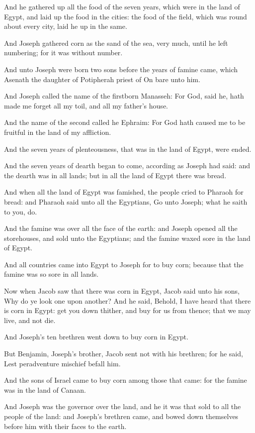 \Verse And he gathered up all the food of the seven years, which were in the land of Egypt, and laid up the food in the cities: the food of the field, which was round about every city, laid he up in the same.

\Verse And Joseph gathered corn as the sand of the sea, very much, until he left numbering; for it was without number.

\Verse And unto Joseph were born two sons before the years of famine came, which Asenath the daughter of Potipherah priest of On bare unto him.

\Verse And Joseph called the name of the firstborn Manasseh: For God, said he, hath made me forget all my toil, and all my father's house.

\Verse And the name of the second called he Ephraim: For God hath caused me to be fruitful in the land of my affliction.

\Verse And the seven years of plenteousness, that was in the land of Egypt, were ended.

\Verse And the seven years of dearth began to come, according as Joseph had said: and the dearth was in all lands; but in all the land of Egypt there was bread.

\Verse And when all the land of Egypt was famished, the people cried to Pharaoh for bread: and Pharaoh said unto all the Egyptians, Go unto Joseph; what he saith to you, do.

\Verse And the famine was over all the face of the earth: and Joseph opened all the storehouses, and sold unto the Egyptians; and the famine waxed sore in the land of Egypt.

\Verse And all countries came into Egypt to Joseph for to buy corn; because that the famine was so sore in all lands.

\Chapter
\Verse Now when Jacob saw that there was corn in Egypt, Jacob said unto his sons, Why do ye look one upon another?  \Verse And he said, Behold, I have heard that there is corn in Egypt: get you down thither, and buy for us from thence; that we may live, and not die.

\Verse And Joseph's ten brethren went down to buy corn in Egypt.

\Verse But Benjamin, Joseph's brother, Jacob sent not with his brethren; for he said, Lest peradventure mischief befall him.

\Verse And the sons of Israel came to buy corn among those that came: for the famine was in the land of Canaan.

\Verse And Joseph was the governor over the land, and he it was that sold to all the people of the land: and Joseph's brethren came, and bowed down themselves before him with their faces to the earth.

